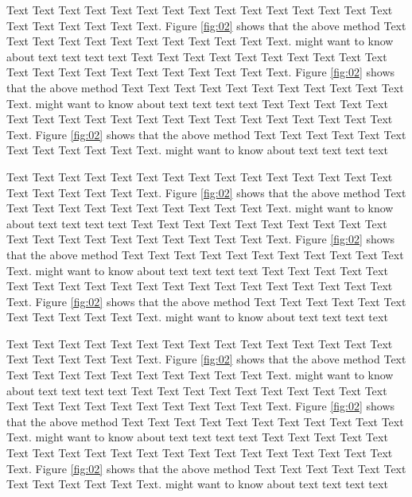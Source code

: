 \documentclass{Rpd}
\begin{document}
Text Text Text Text Text Text  Text Text Text Text Text Text Text Text Text  Text Text Text Text Text Text. Figure \ref{fig:02} shows that the above method  Text Text Text Text  Text Text Text Text Text Text  Text Text.  \cite{Boffelli03} might want to know about  text text text text
Text Text Text Text Text Text  Text Text Text Text Text Text Text Text Text  Text Text Text Text Text Text. Figure \ref{fig:02} shows that the above method  Text Text Text Text  Text Text Text Text Text Text  Text Text.  \cite{Boffelli03} might want to know about  text text text text
Text Text Text Text Text Text  Text Text Text Text Text Text Text Text Text  Text Text Text Text Text Text. Figure \ref{fig:02} shows that the above method  Text Text Text Text  Text Text Text Text Text Text  Text Text.  \cite{Boffelli03} might want to know about  text text text text

Text Text Text Text Text Text  Text Text Text Text Text Text Text Text Text  Text Text Text Text Text Text. Figure \ref{fig:02} shows that the above method  Text Text Text Text  Text Text Text Text Text Text  Text Text.  \cite{Boffelli03} might want to know about  text text text text
Text Text Text Text Text Text  Text Text Text Text Text Text Text Text Text  Text Text Text Text Text Text. Figure \ref{fig:02} shows that the above method  Text Text Text Text  Text Text Text Text Text Text  Text Text.  \cite{Boffelli03} might want to know about  text text text text
Text Text Text Text Text Text  Text Text Text Text Text Text Text Text Text  Text Text Text Text Text Text. Figure \ref{fig:02} shows that the above method  Text Text Text Text  Text Text Text Text Text Text  Text Text.  \cite{Boffelli03} might want to know about  text text text text

Text Text Text Text Text Text  Text Text Text Text Text Text Text Text Text  Text Text Text Text Text Text. Figure \ref{fig:02} shows that the above method  Text Text Text Text  Text Text Text Text Text Text  Text Text.  \cite{Boffelli03} might want to know about  text text text text
Text Text Text Text Text Text  Text Text Text Text Text Text Text Text Text  Text Text Text Text Text Text. Figure \ref{fig:02} shows that the above method  Text Text Text Text  Text Text Text Text Text Text  Text Text.  \cite{Boffelli03} might want to know about  text text text text
Text Text Text Text Text Text  Text Text Text Text Text Text Text Text Text  Text Text Text Text Text Text. Figure \ref{fig:02} shows that the above method  Text Text Text Text  Text Text Text Text Text Text  Text Text.  \cite{Boffelli03} might want to know about  text text text text
\end{document}
